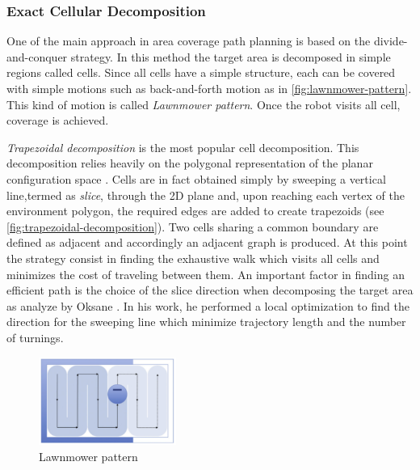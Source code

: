 \subsubsection{Exact Cellular Decomposition} %
\label{ssub:exact_cellular_decomposition}
One of the main approach in area coverage path planning is based on the divide-and-conquer strategy.
In this method the target area is decomposed in simple regions called cells. Since all cells have a simple structure, each can be covered with simple motions such as back-and-forth motion as in \autoref{fig:lawnmower-pattern}. This kind of motion is called \textit{Lawnmower pattern}. Once the robot visits all cell, coverage is achieved.\par
\textit{Trapezoidal decomposition} is the most popular cell decomposition. This decomposition relies heavily on the polygonal representation of the planar configuration space \cite{book:655068}. Cells are in fact obtained simply by sweeping a vertical line,termed as \textit{slice}, through the 2D plane and, upon reaching each vertex of the environment polygon, the required edges are added to create trapezoids (see \autoref{fig:trapezoidal-decomposition}). Two cells sharing a common boundary are defined as adjacent and accordingly an adjacent graph is produced. At this point the strategy consist in finding the exhaustive walk which visits all cells and minimizes the cost of traveling between them.
An important factor in finding an efficient path is the choice of the slice direction when decomposing the target area as analyze by Oksane \cite{TrapezoidalDecompCPP}. In his work, he performed a local optimization to find the direction for the sweeping line which minimize trajectory length and the number of turnings. \par
\begin{figure}[ht]
    \centering
    \includegraphics[width=0.4\textwidth]{figures/C3/LawnmowerPattern.png}
    \caption{Lawnmower pattern}
    \label{fig:lawnmower-pattern}
\end{figure}

